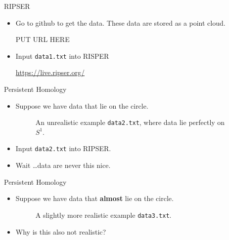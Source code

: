 \begin{frame}{RIPSER}
\begin{center}
\end{center}
\begin{itemize}
\item<1-> Go to github to get the data. These data are stored as a point cloud.
\begin{center}
PUT URL HERE
\end{center}
\item<2-> Input \texttt{data1.txt} into RISPER
\begin{center}
\url{https://live.ripser.org/}
\end{center}
\end{itemize}
\end{frame}
\begin{frame}{Persistent Homology}
\begin{itemize}
\item<1-> Suppose we have data that lie on the circle.
\begin{center}
\begin{figure}
\caption{An unrealistic example \texttt{data2.txt}, where data lie perfectly on $S^1$.}
\end{figure}
\end{center}
\item<2-> Input \texttt{data2.txt} into RIPSER.
\item<2-> Wait \ldots data are never this nice.
\end{itemize}
\end{frame}
\begin{frame}{Persistent Homology}
\begin{itemize}
\item<1-> Suppose we have data that \textbf{almost} lie on the circle.
\begin{center}
\begin{figure}
\caption{A slightly more realistic example \texttt{data3.txt}.}
\end{figure}
\end{center}
\item<2-> Why is this also not realistic?
\end{itemize}
\end{frame}
